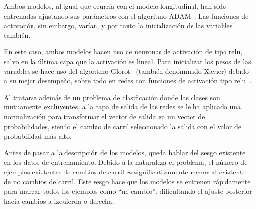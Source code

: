 Ambos modelos, al igual que ocurría con el modelo longitudinal, han sido entrenados ajustando sus parámetros con el algoritmo ADAM~\cite{kingma2014adam}. Las funciones de activación, sin embargo, varían, y por tanto la inicialización de las variables también.

En este caso, ambos modelos hacen uso de neuronas de activación de tipo \ac{relu}, salvo en la última capa que la activación es lineal. Para inicializar los pesos de las variables se hace uso del algoritmo Glorot~\cite{glorot2010understanding} (también denominado Xavier) debido a su mejor desempeño, sobre todo en redes con funciones de activación tipo \ac{relu}~\cite{glorot2011deep}.

Al tratarse además de un problema de clasificación donde las clases son mutuamente excluyentes, a la capa de salida de las redes se le ha aplicado una normalización para transformar el vector de salida en un vector de probabilidades, siendo el cambio de carril seleccionado la salida con el valor de probabilidad más alto.

Antes de pasar a la descripción de los modelos, queda hablar del sesgo existente en los datos de entrenamiento. Debido a la naturaleza el problema, el número de ejemplos existentes de cambios de carril es significativamente menor al existente de no cambios de carril. Este sesgo hace que los modelos se entrenen rápidamente para marcar todos los ejemplos como \enquote{no cambio}, dificultando el ajuste posterior hacia cambios a izquierda o derecha.

